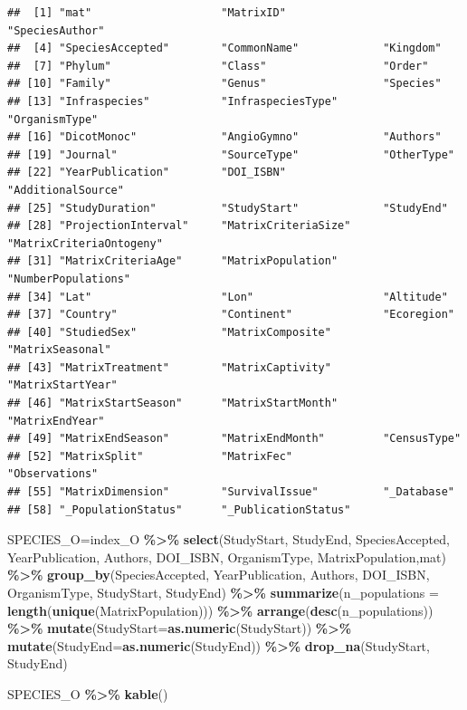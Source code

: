 \documentclass[
]{book}
\newenvironment{Shaded}{\begin{snugshade}}{\end{snugshade}}
\newcommand{\AttributeTok}[1]{\textcolor[rgb]{0.13,0.29,0.53}{#1}}
\newcommand{\FunctionTok}[1]{\textcolor[rgb]{0.13,0.29,0.53}{\textbf{#1}}}
\newcommand{\NormalTok}[1]{#1}
\newcommand{\OtherTok}[1]{\textcolor[rgb]{0.56,0.35,0.01}{#1}}
\newcommand{\SpecialCharTok}[1]{\textcolor[rgb]{0.81,0.36,0.00}{\textbf{#1}}}
\theoremstyle{definition}
\theoremstyle{definition}
\theoremstyle{definition}
\theoremstyle{definition}
\theoremstyle{remark}
\begin{document}
\begin{verbatim}
##  [1] "mat"                    "MatrixID"               "SpeciesAuthor"         
##  [4] "SpeciesAccepted"        "CommonName"             "Kingdom"               
##  [7] "Phylum"                 "Class"                  "Order"                 
## [10] "Family"                 "Genus"                  "Species"               
## [13] "Infraspecies"           "InfraspeciesType"       "OrganismType"          
## [16] "DicotMonoc"             "AngioGymno"             "Authors"               
## [19] "Journal"                "SourceType"             "OtherType"             
## [22] "YearPublication"        "DOI_ISBN"               "AdditionalSource"      
## [25] "StudyDuration"          "StudyStart"             "StudyEnd"              
## [28] "ProjectionInterval"     "MatrixCriteriaSize"     "MatrixCriteriaOntogeny"
## [31] "MatrixCriteriaAge"      "MatrixPopulation"       "NumberPopulations"     
## [34] "Lat"                    "Lon"                    "Altitude"              
## [37] "Country"                "Continent"              "Ecoregion"             
## [40] "StudiedSex"             "MatrixComposite"        "MatrixSeasonal"        
## [43] "MatrixTreatment"        "MatrixCaptivity"        "MatrixStartYear"       
## [46] "MatrixStartSeason"      "MatrixStartMonth"       "MatrixEndYear"         
## [49] "MatrixEndSeason"        "MatrixEndMonth"         "CensusType"            
## [52] "MatrixSplit"            "MatrixFec"              "Observations"          
## [55] "MatrixDimension"        "SurvivalIssue"          "_Database"             
## [58] "_PopulationStatus"      "_PublicationStatus"
\end{verbatim}

\begin{Shaded}
\begin{Highlighting}[]
\NormalTok{SPECIES\_O}\OtherTok{=}\NormalTok{index\_O }\SpecialCharTok{\%\textgreater{}\%} \FunctionTok{select}\NormalTok{(StudyStart, StudyEnd, SpeciesAccepted, YearPublication, Authors, DOI\_ISBN, OrganismType, MatrixPopulation,mat) }\SpecialCharTok{\%\textgreater{}\%} 
  \FunctionTok{group\_by}\NormalTok{(SpeciesAccepted, YearPublication, Authors, DOI\_ISBN, OrganismType, StudyStart, StudyEnd) }\SpecialCharTok{\%\textgreater{}\%} 
  \FunctionTok{summarize}\NormalTok{(}\AttributeTok{n\_populations =} \FunctionTok{length}\NormalTok{(}\FunctionTok{unique}\NormalTok{(MatrixPopulation))) }\SpecialCharTok{\%\textgreater{}\%} 
  \FunctionTok{arrange}\NormalTok{(}\FunctionTok{desc}\NormalTok{(n\_populations)) }\SpecialCharTok{\%\textgreater{}\%} 
  \FunctionTok{mutate}\NormalTok{(}\AttributeTok{StudyStart=}\FunctionTok{as.numeric}\NormalTok{(StudyStart)) }\SpecialCharTok{\%\textgreater{}\%} 
  \FunctionTok{mutate}\NormalTok{(}\AttributeTok{StudyEnd=}\FunctionTok{as.numeric}\NormalTok{(StudyEnd)) }\SpecialCharTok{\%\textgreater{}\%} 
  \FunctionTok{drop\_na}\NormalTok{(StudyStart, StudyEnd)}

\NormalTok{SPECIES\_O }\SpecialCharTok{\%\textgreater{}\%} \FunctionTok{kable}\NormalTok{()}
\end{Highlighting}
\end{Shaded}
\end{document}
